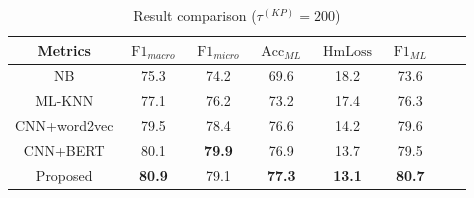 \begin{table}[htbp!]
    \caption{Result comparison (\(\tau^{(KP)}=200 \))}\label{tbl:bsline1}
    \centering
    \begin{tabular}{cccccccc}
        \toprule
        Metrics      & \(\operatorname{F1}_{macro}\) & \(\operatorname{F1}_{micro}\) & \(\operatorname{Acc}_{ML}\) & \(\operatorname{HmLoss}\) & \(\operatorname{F1}_{ML}\) \\
        \midrule
        NB           & 75.3                          & 74.2                          & 69.6                        & 18.2                      & 73.6                       \\
        ML-KNN       & 77.1                          & 76.2                          & 73.2                        & 17.4                      & 76.3                       \\
        CNN+word2vec & 79.5                          & 78.4                          & 76.6                        & 14.2                      & 79.6                       \\
        CNN+BERT     & 80.1                          & \textbf{79.9}                 & 76.9                        & 13.7                      & 79.5                       \\
        Proposed     & \textbf{80.9}                 & 79.1                          & \textbf{77.3}               & \textbf{13.1}             & \textbf{80.7}              \\
        \bottomrule
    \end{tabular}
\end{table}

